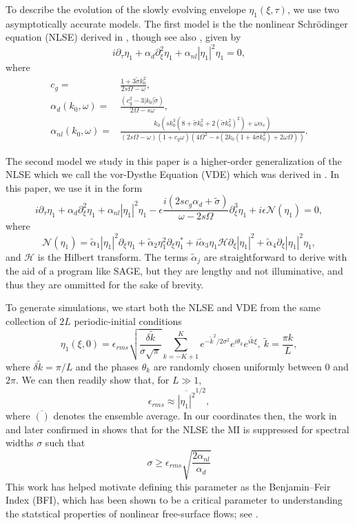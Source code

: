 \documentclass[a4paper,11pt]{article}
\newcommand{\pd}{\partial}
\begin{document}
To describe the evolution of the slowly evolving envelope $\eta_{1}(\xi,\tau)$, we use two asymptotically accurate models.  The first model is the the nonlinear Schr\"{o}dinger equation (NLSE) derived in \cite{curtis8}, though see also \cite{thomas2012nonlinear}, given by 
\[
i\pd_{\tau}\eta_{1} + \alpha_{d}\pd_{\xi}^{2}\eta_{1} + \alpha_{nl}\left|\eta_{1} \right|^{2}\eta_{1} = 0, 
\]
where 
\begin{align*}
c_{g} = & \frac{1+3\tilde{\sigma}k_{0}^{2}}{2s\Omega - \omega},\\
\alpha_{d}(k_{0},\omega) = & \frac{(c^2_{g} - 3|k_{0}|\tilde{\sigma})}{2\Omega-s\omega},\\
\alpha_{nl}(k_{0},\omega) = & \frac{k_{0}\left( sk_{0}^{3}\left(8 + \tilde{\sigma}k_{0}^{2} + 2(\tilde{\sigma}k_{0}^{2})^{2}\right) + \omega \alpha_{v}\right)}{\left(2s\Omega -\omega\right)(1+c_{g}\omega)\left(4\Omega^2-s(2k_{0}(1+4\tilde{\sigma}k_{0}^{2})+2\omega\Omega)\right)}.
\end{align*}

The second model we study in this paper is a higher-order generalization of the NLSE which we call the vor-Dysthe Equation (VDE) which was derived in \cite{curtis8}.  In this paper, we use it in the form 
\[
i\pd_{\tau}\eta_{1} + \alpha_{d}\pd_{\xi}^{2}\eta_{1} + \alpha_{nl}\left|\eta_{1} \right|^{2}\eta_{1} - \epsilon\frac{i(2sc_{g}\alpha_{d}+\tilde{\sigma})}{\omega-2s\Omega}\pd^{3}_{\xi}\eta_{1} + i\epsilon\mathcal{N}(\eta_{1}) = 0, 
\]
where
\[
\mathcal{N}(\eta_{1}) = \tilde{\alpha}_{1}\left|\eta_{1}\right|^{2}\pd_{\xi}\eta_{1} + \tilde{\alpha}_{2} \eta_{1}^{2}\pd_{\xi}\eta^{\ast}_{1} + i\tilde{\alpha}_{3}\eta_{1}\mathcal{H}\pd_{\xi}\left| \eta_{1}\right|^{2} + \tilde{\alpha}_{4}\pd_{\xi}\left| \eta_{1}\right|^{2}\eta_{1},
\]
and $\mathcal{H}$ is the Hilbert transform.  The terms $\tilde{\alpha}_{j}$ are straightforward to derive with the aid of a program like SAGE, but they are lengthy and not illuminative, and thus they are ommitted for the sake of brevity.  

To generate simulations, we start both the NLSE and VDE from the same collection of $2L$ periodic-initial conditions
\[
\eta_{1}(\xi,0) = \epsilon_{rms}\sqrt{\frac{\delta \tilde{k}}{\sigma\sqrt{\pi}}} \sum_{k=-K+1}^{K}e^{-\tilde{k}^{2}/2\sigma^{2}}e^{i\theta_{k}}e^{i\tilde{k}\xi}, ~ \tilde{k} = \frac{\pi k}{L},
\]
where $\delta \tilde{k}=\pi/L$ and the phases $\theta_{k}$ are randomly chosen uniformly between $0$ and $2\pi$.  We can then readily show that, for $L\gg 1$, 
\[
\epsilon_{rms} \approx \overline{\left|\eta_{1}\right|^{2}}^{1/2},
\]
where $\overline{()}$ denotes the ensemble average.  In our coordinates then, the work in \cite{alber} and later confirmed in \cite{dysthe2} shows that for the NLSE the MI is suppressed for spectral widths $\sigma$ such that 
\[
\sigma \geq \epsilon_{rms}\sqrt{\frac{2\alpha_{nl}}{\alpha_{d}}}
\]
This work has helped motivate defining this parameter as the Benjamin--Feir Index (BFI), which has been shown to be a critical parameter to understanding the statstical properties of nonlinear free-surface flows; see \cite{onorato, thomas2012nonlinear}.
\end{document}
